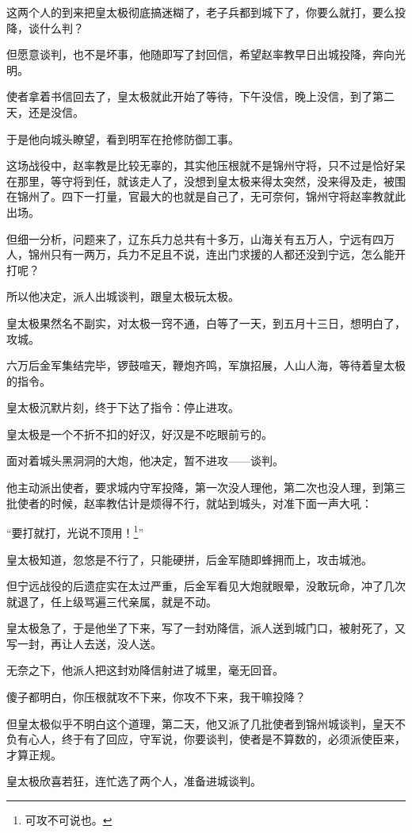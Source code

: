\begin{multicols}{\theparacolNo}
这两个人的到来把皇太极彻底搞迷糊了，老子兵都到城下了，你要么就打，要么投降，谈什么判？

但愿意谈判，也不是坏事，他随即写了封回信，希望赵率教早日出城投降，奔向光明。

使者拿着书信回去了，皇太极就此开始了等待，下午没信，晚上没信，到了第二天，还是没信。

于是他向城头瞭望，看到明军在抢修防御工事。

这场战役中，赵率教是比较无辜的，其实他压根就不是锦州守将，只不过是恰好呆在那里，等守将到任，就该走人了，没想到皇太极来得太突然，没来得及走，被围在锦州了。四下一打量，官最大的也就是自己了，无可奈何，锦州守将赵率教就此出场。

但细一分析，问题来了，辽东兵力总共有十多万，山海关有五万人，宁远有四万人，锦州只有一两万，兵力不足且不说，连出门求援的人都还没到宁远，怎么能开打呢？

所以他决定，派人出城谈判，跟皇太极玩太极。

皇太极果然名不副实，对太极一窍不通，白等了一天，到五月十三日，想明白了，攻城。

六万后金军集结完毕，锣鼓喧天，鞭炮齐鸣，军旗招展，人山人海，等待着皇太极的指令。

皇太极沉默片刻，终于下达了指令：停止进攻。

皇太极是一个不折不扣的好汉，好汉是不吃眼前亏的。

面对着城头黑洞洞的大炮，他决定，暂不进攻——谈判。

他主动派出使者，要求城内守军投降，第一次没人理他，第二次也没人理，到第三批使者的时候，赵率教估计是烦得不行，就站到城头，对准下面一声大吼：

“要打就打，光说不顶用！\footnote{可攻不可说也。}”

皇太极知道，忽悠是不行了，只能硬拼，后金军随即蜂拥而上，攻击城池。

但宁远战役的后遗症实在太过严重，后金军看见大炮就眼晕，没敢玩命，冲了几次就退了，任上级骂遍三代亲属，就是不动。

皇太极急了，于是他坐了下来，写了一封劝降信，派人送到城门口，被射死了，又写一封，再让人去送，没人送。

无奈之下，他派人把这封劝降信射进了城里，毫无回音。

傻子都明白，你压根就攻不下来，你攻不下来，我干嘛投降？

但皇太极似乎不明白这个道理，第二天，他又派了几批使者到锦州城谈判，皇天不负有心人，终于有了回应，守军说，你要谈判，使者是不算数的，必须派使臣来，才算正规。

皇太极欣喜若狂，连忙选了两个人，准备进城谈判。


\end{multicols}

